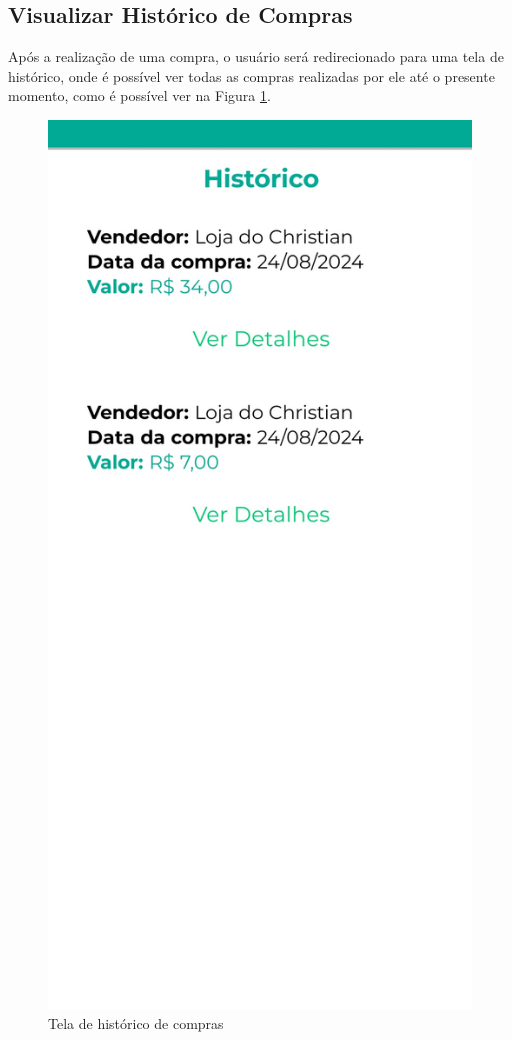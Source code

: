 \subsection{Visualizar Histórico de Compras}
Após a realização de uma compra, o usuário será redirecionado para uma tela de histórico, onde é possível ver todas as compras realizadas por ele até o presente momento, como é possível ver na Figura \ref{tela-historico-app}.

\begin{figure}[h]
	\centering
	\includegraphics[keepaspectratio=true,scale=0.16]{figuras/historico_compras.jpg}
	\caption{Tela de histórico de compras}
        \label{tela-historico-app}
\end{figure}

